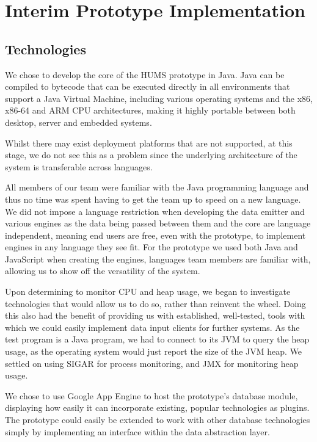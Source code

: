 \documentclass[10pt,a4paper]{article}
\begin{document}
\section{Interim Prototype Implementation}

\subsection{Technologies}

We chose to develop the core of the HUMS prototype in Java. Java can
be compiled to bytecode that can be executed directly in all
environments that support a Java Virtual Machine, including various
operating systems and the x86, x86-64 and ARM CPU architectures,
making it highly portable between both desktop, server and embedded
systems.


Whilst there may exist deployment platforms that are not supported, at
this stage, we do not see this as a problem since the underlying
architecture of the system is transferable across languages.

All members of our team were familiar with the Java programming
language and thus no time was spent having to get the team up to speed
on a new language. We did not impose a language restriction when
developing the data emitter and various engines as the data being
passed between them and the core are language independent, meaning 
end users are free, even with the prototype, to implement engines in any
language they see fit. For the prototype we used both Java and
JavaScript when creating the engines, languages team members are
familiar with, allowing us to show off the versatility of the system.

Upon determining to monitor CPU and heap usage, we began to investigate
technologies that would allow us to do so, rather than reinvent the wheel.
Doing this also had the benefit of providing us with established, well-tested,
tools with which we could easily implement data input clients for further
systems. As the test program is a Java program, we had to connect to its JVM to query the heap usage, as the operating system would just report the size of the JVM heap. We settled on using SIGAR for process monitoring, and JMX for monitoring heap usage.

We chose to use Google App Engine to host the prototype's database
module, displaying how easily it can incorporate existing, popular
technologies as plugins. The prototype could easily be extended to
work with other database technologies simply by implementing an
interface within the data abstraction layer.
\end{document}
